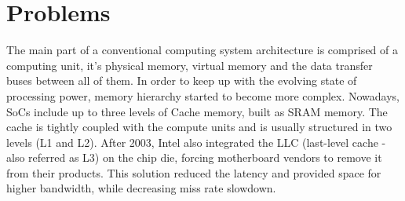 \documentclass[12pt,journal,compsoc]{IEEEtran}
\begin{document}
%





\section{Problems}
The main part of a conventional computing system architecture is comprised of a computing unit, it's physical memory, virtual memory and the data transfer buses between all of them. In order to keep up with the evolving state of processing power, memory hierarchy started to become more complex. Nowadays, SoCs include up to three levels of Cache memory, built as SRAM memory. The cache is tightly coupled with the compute units and is usually structured in two levels (L1 and L2). After 2003, Intel also integrated the LLC (last-level cache - also referred as L3) on the chip die, forcing motherboard vendors to remove it from their products. This solution reduced the latency and provided space for higher bandwidth, while decreasing miss rate slowdown.
\end{document}
